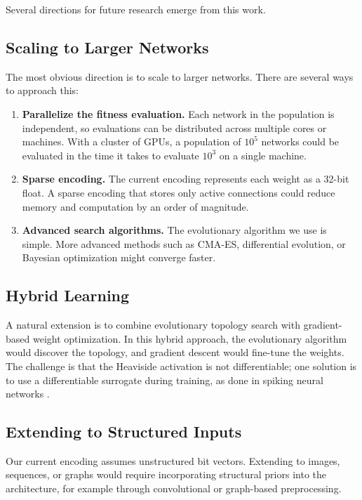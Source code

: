 Several directions for future research emerge from this work.

\subsection{Scaling to Larger Networks}

The most obvious direction is to scale \modnet{} to larger networks.
There are several ways to approach this:

\begin{enumerate}
  \item \textbf{Parallelize the fitness evaluation.} Each network in
    the population is independent, so evaluations can be distributed
    across multiple cores or machines. With a cluster of GPUs, a
    population of $10^5$ networks could be evaluated in the time it
    takes to evaluate $10^3$ on a single machine.

  \item \textbf{Sparse encoding.} The current encoding represents each
    weight as a 32-bit float. A sparse encoding that stores only
    active connections could reduce memory and computation by an
    order of magnitude.

  \item \textbf{Advanced search algorithms.} The evolutionary algorithm
    we use is simple. More advanced methods such as CMA-ES,
    differential evolution, or Bayesian optimization might converge
    faster.
\end{enumerate}

\subsection{Hybrid Learning}

A natural extension is to combine evolutionary topology search with
gradient-based weight optimization. In this hybrid approach, the
evolutionary algorithm would discover the topology, and gradient
descent would fine-tune the weights. The challenge is that the
Heaviside activation is not differentiable; one solution is to use a
differentiable surrogate during training, as done in spiking neural
networks \citep{neftci2019surrogate}.

\subsection{Extending to Structured Inputs}

Our current encoding assumes unstructured bit vectors. Extending
\modnet{} to images, sequences, or graphs would require incorporating
structural priors into the architecture, for example through
convolutional or graph-based preprocessing.

